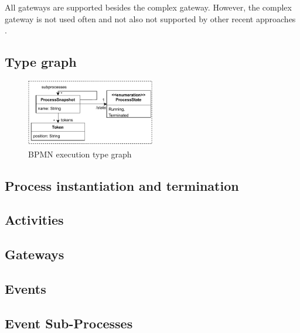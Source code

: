 \documentclass[adraft, copyright, creativecommons]{eptcs} %
\begin{document}
All gateways are supported besides the complex gateway.
However, the complex gateway is not used often \cite{freundRealLifeBPMNUsing2019} and not also not supported by other recent approaches \cite{corradiniFormalApproachAnalysis2021, houhouFirstOrderLogicVerification2022, vangorpVisualTokenbasedFormalization2013}.

\subsection{Type graph}

\begin{figure}[h]
    \centering
    \includegraphics[width=0.5\textwidth]{images/bpmn_semantics-typegraph.pdf}
    \caption{BPMN execution type graph} %
    \label{fig:typeGraph}
\end{figure}

\subsection{Process instantiation and termination}

\subsection{Activities}
\subsection{Gateways}
\subsection{Events}

\subsection{Event Sub-Processes}
\end{document}
